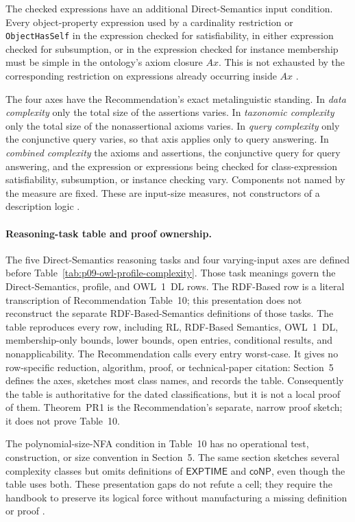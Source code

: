 The checked expressions have an additional Direct-Semantics input condition.
Every object-property expression used by a cardinality restriction or
\texttt{ObjectHasSelf} in the expression checked for satisfiability, in either
expression checked for subsumption, or in the expression checked for instance
membership must be simple in the ontology's axiom closure \(Ax\).  This is not
exhausted by the corresponding restriction on expressions already occurring
inside \(Ax\) \cite[\S2.5]{W3COWL2DirectSemantics2012}.

The four axes have the Recommendation's exact metalinguistic standing.  In
\emph{data complexity} only the total size of the assertions varies.  In
\emph{taxonomic complexity} only the total size of the nonassertional axioms
varies.  In \emph{query complexity} only the conjunctive query varies, so that
axis applies only to query answering.  In \emph{combined complexity} the
axioms and assertions, the conjunctive query for query answering, and the
expression or expressions being checked for class-expression satisfiability,
subsumption, or instance checking vary.  Components not named by the measure
are fixed.  These are input-size measures, not constructors of a description
logic \cite[\S5 and table~10]{W3COWL2Profiles2012}.

\paragraph{Reasoning-task table and proof ownership.}
The five Direct-Semantics reasoning tasks and four varying-input axes are
defined before Table~\ref{tab:p09-owl-profile-complexity}.  Those task meanings
govern the Direct-Semantics, profile, and OWL~1~DL rows.  The RDF-Based row is a
literal transcription of Recommendation Table~10; this presentation does not
reconstruct the separate RDF-Based-Semantics definitions of those tasks.  The
table reproduces every row, including RL, RDF-Based Semantics, OWL~1~DL,
membership-only bounds, lower bounds, open entries, conditional results, and
nonapplicability.  The Recommendation calls every entry worst-case.  It gives
no row-specific reduction, algorithm, proof, or technical-paper citation:
Section~5 defines the axes, sketches most class names, and records the table.
Consequently the table is authoritative for the dated classifications, but it
is not a local proof of them.  Theorem~PR1 is the Recommendation's separate,
narrow proof sketch; it does not prove Table~10.

The polynomial-size-NFA condition in Table~10 has no operational test,
construction, or size convention in Section~5.  The same section sketches
several complexity classes but omits definitions of \(\mathsf{EXPTIME}\) and
\(\mathsf{coNP}\), even though the table uses both.  These presentation gaps do
not refute a cell; they require the handbook to preserve its logical force
without manufacturing a missing definition or proof
\cite[\S5 and table~10]{W3COWL2Profiles2012}.

